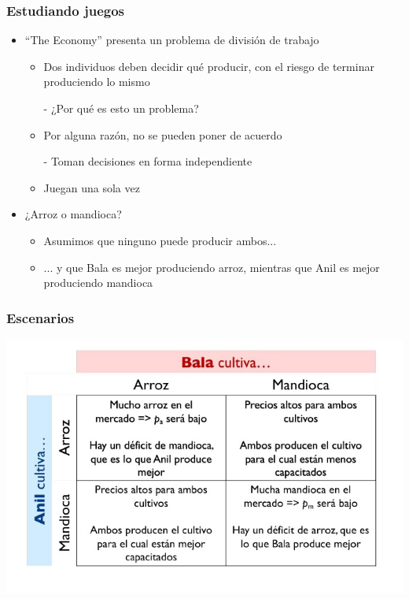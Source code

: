 \documentclass{beamer}
\begin{document}
\begin{frame}
\frametitle{ Estudiando juegos}
\begin{itemize}
\item “The Economy” presenta un problema de división de trabajo
\begin{itemize}
    \item Dos individuos deben decidir qué producir, con el riesgo de terminar produciendo lo mismo
        \begin{itemize}
        - ¿Por qué es esto un problema?
        \end{itemize}
        \item Por alguna razón, no se pueden poner de acuerdo
        \begin{itemize}
        - Toman decisiones en forma independiente
        \end{itemize}
        \item Juegan una sola vez
        \end{itemize}
    \item ¿Arroz o mandioca?
        \begin{itemize}
        \item Asumimos que ninguno puede producir ambos...
        \item ... y que Bala es mejor produciendo arroz, mientras que Anil es mejor produciendo mandioca
    \end{itemize}
\end{itemize}
\end{frame}

\begin{frame}
\frametitle{ Escenarios}
\centering
\includegraphics[scale=0.65]{Figures/Tema_03_7_bala.jpg}
\end{frame}
\end{document}
